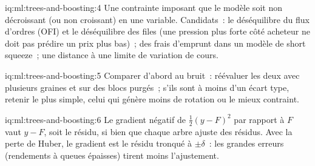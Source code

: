 \begin{solution}{iq:ml:trees-and-boosting:4}
Une contrainte imposant que le modèle soit non décroissant (ou non croissant) en une variable. Candidats~: le déséquilibre du flux d'ordres (OFI) et
le déséquilibre des files (une pression plus forte côté acheteur ne doit pas prédire un prix plus bas)~; des frais d'emprunt dans un modèle de short squeeze~; une
distance à une limite de variation de cours.
\end{solution}

\begin{solution}{iq:ml:trees-and-boosting:5}
Comparer d'abord au bruit~: réévaluer les deux avec plusieurs graines et sur des blocs purgés~; s'ils sont à moins d'un écart
type, retenir le plus simple, celui qui génère moins de rotation ou le mieux contraint.
\end{solution}

\begin{solution}{iq:ml:trees-and-boosting:6}
Le gradient négatif de $\frac12(y - F)^2$ par rapport à $F$ vaut $y - F$, soit le résidu, si bien que chaque arbre ajuste des résidus. Avec la perte de
Huber, le gradient est le résidu tronqué à $\pm\delta$~: les grandes erreurs (rendements à queues épaisses) tirent moins l'ajustement.
\end{solution}
